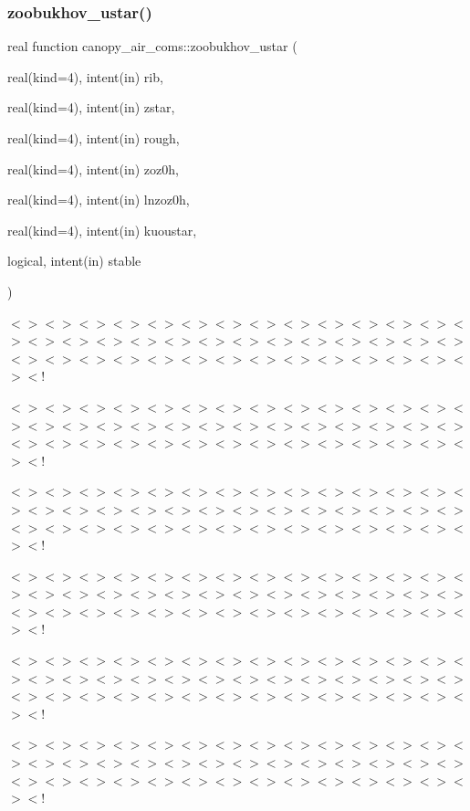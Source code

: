 \subsubsection{\texorpdfstring{zoobukhov\+\_\+ustar()}{zoobukhov\_ustar()}}
{\footnotesize\ttfamily real function canopy\+\_\+air\+\_\+coms\+::zoobukhov\+\_\+ustar (\begin{DoxyParamCaption}\item[{real(kind=4), intent(in)}]{rib,  }\item[{real(kind=4), intent(in)}]{zstar,  }\item[{real(kind=4), intent(in)}]{rough,  }\item[{real(kind=4), intent(in)}]{zoz0h,  }\item[{real(kind=4), intent(in)}]{lnzoz0h,  }\item[{real(kind=4), intent(in)}]{kuoustar,  }\item[{logical, intent(in)}]{stable }\end{DoxyParamCaption})}

$<$$>$$<$$>$$<$$>$$<$$>$$<$$>$$<$$>$$<$$>$$<$$>$$<$$>$$<$$>$$<$$>$$<$$>$$<$$>$$<$$>$$<$$>$$<$$>$$<$$>$$<$$>$$<$$>$$<$$>$$<$$>$$<$$>$$<$$>$$<$$>$$<$$>$$<$$>$$<$$>$$<$$>$$<$$>$$<$$>$$<$$>$$<$$>$$<$$>$$<$$>$$<$$>$$<$$>$$<$$>$$<$$>$$<$$>$$<$$>$$<$$>$$<$!

$<$$>$$<$$>$$<$$>$$<$$>$$<$$>$$<$$>$$<$$>$$<$$>$$<$$>$$<$$>$$<$$>$$<$$>$$<$$>$$<$$>$$<$$>$$<$$>$$<$$>$$<$$>$$<$$>$$<$$>$$<$$>$$<$$>$$<$$>$$<$$>$$<$$>$$<$$>$$<$$>$$<$$>$$<$$>$$<$$>$$<$$>$$<$$>$$<$$>$$<$$>$$<$$>$$<$$>$$<$$>$$<$$>$$<$$>$$<$$>$$<$$>$$<$!

$<$$>$$<$$>$$<$$>$$<$$>$$<$$>$$<$$>$$<$$>$$<$$>$$<$$>$$<$$>$$<$$>$$<$$>$$<$$>$$<$$>$$<$$>$$<$$>$$<$$>$$<$$>$$<$$>$$<$$>$$<$$>$$<$$>$$<$$>$$<$$>$$<$$>$$<$$>$$<$$>$$<$$>$$<$$>$$<$$>$$<$$>$$<$$>$$<$$>$$<$$>$$<$$>$$<$$>$$<$$>$$<$$>$$<$$>$$<$$>$$<$$>$$<$!

$<$$>$$<$$>$$<$$>$$<$$>$$<$$>$$<$$>$$<$$>$$<$$>$$<$$>$$<$$>$$<$$>$$<$$>$$<$$>$$<$$>$$<$$>$$<$$>$$<$$>$$<$$>$$<$$>$$<$$>$$<$$>$$<$$>$$<$$>$$<$$>$$<$$>$$<$$>$$<$$>$$<$$>$$<$$>$$<$$>$$<$$>$$<$$>$$<$$>$$<$$>$$<$$>$$<$$>$$<$$>$$<$$>$$<$$>$$<$$>$$<$$>$$<$!

$<$$>$$<$$>$$<$$>$$<$$>$$<$$>$$<$$>$$<$$>$$<$$>$$<$$>$$<$$>$$<$$>$$<$$>$$<$$>$$<$$>$$<$$>$$<$$>$$<$$>$$<$$>$$<$$>$$<$$>$$<$$>$$<$$>$$<$$>$$<$$>$$<$$>$$<$$>$$<$$>$$<$$>$$<$$>$$<$$>$$<$$>$$<$$>$$<$$>$$<$$>$$<$$>$$<$$>$$<$$>$$<$$>$$<$$>$$<$$>$$<$$>$$<$!

$<$$>$$<$$>$$<$$>$$<$$>$$<$$>$$<$$>$$<$$>$$<$$>$$<$$>$$<$$>$$<$$>$$<$$>$$<$$>$$<$$>$$<$$>$$<$$>$$<$$>$$<$$>$$<$$>$$<$$>$$<$$>$$<$$>$$<$$>$$<$$>$$<$$>$$<$$>$$<$$>$$<$$>$$<$$>$$<$$>$$<$$>$$<$$>$$<$$>$$<$$>$$<$$>$$<$$>$$<$$>$$<$$>$$<$$>$$<$$>$$<$$>$$<$!


